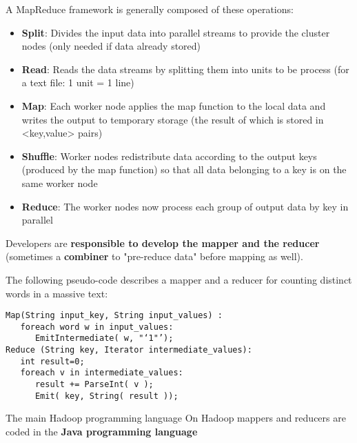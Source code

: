 \documentclass{beamer}[10pt, usepdftitle=false handout]
\begin{document}
\begin{frame}

A MapReduce framework is generally composed of these operations:
\vspace*{0.6em}

\begin{itemize}
	\item{\textbf{Split}: Divides the input data into parallel streams to provide the cluster nodes (only needed if data already stored)}
	\item{\textbf{Read}: Reads the data streams by splitting them into units to be process (for a text file: 1 unit =  1 line)}
	\item{\textbf{Map}\footnotemark[1]: Each worker node applies the map function to the local data and writes the output to temporary storage (the result of which is stored in <key,value> pairs)}
	\item{\textbf{Shuffle}: Worker nodes redistribute data according to the output keys (produced by the map function) so that all data belonging to a key is on the same worker node}
	\item{\textbf{Reduce}\footnotemark[1]: The worker nodes now process each group of output data by key in parallel}
\end{itemize} 
\vspace*{0.6em}

\end{frame}
\begin{frame}[fragile]

Developers are \textbf{responsible to develop the mapper and the reducer} (sometimes a \textbf{combiner} to "pre-reduce data" before mapping as well).
\vspace*{0.6em}

The following pseudo-code describes a mapper and a reducer for counting distinct words in a massive text:
\vspace*{0.6em}

\begin{verbatim}
Map(String input_key, String input_values) :
   foreach word w in input_values:
      EmitIntermediate( w, "‘1"’);
Reduce (String key, Iterator intermediate_values):
   int result=0;
   foreach v in intermediate_values:
      result += ParseInt( v );
      Emit( key, String( result ));
\end{verbatim}

\begin{block}{The main Hadoop programming language}
On Hadoop  mappers and reducers are coded in the \textbf{Java programming language}
\end{block}

\end{frame}
\end{document}
